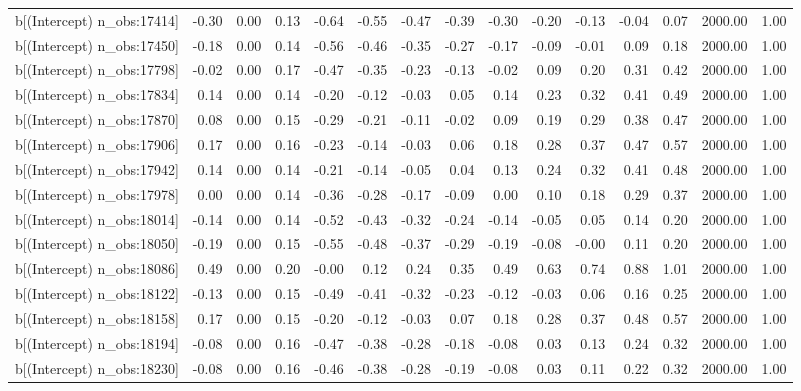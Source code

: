 \begin{table}[ht]
\begin{tabular}{rrrrrrrrrrrrrrr}
  b[(Intercept) n\_obs:17414] & -0.30 & 0.00 & 0.13 & -0.64 & -0.55 & -0.47 & -0.39 & -0.30 & -0.20 & -0.13 & -0.04 & 0.07 & 2000.00 & 1.00 \\ 
  b[(Intercept) n\_obs:17450] & -0.18 & 0.00 & 0.14 & -0.56 & -0.46 & -0.35 & -0.27 & -0.17 & -0.09 & -0.01 & 0.09 & 0.18 & 2000.00 & 1.00 \\ 
  b[(Intercept) n\_obs:17798] & -0.02 & 0.00 & 0.17 & -0.47 & -0.35 & -0.23 & -0.13 & -0.02 & 0.09 & 0.20 & 0.31 & 0.42 & 2000.00 & 1.00 \\ 
  b[(Intercept) n\_obs:17834] & 0.14 & 0.00 & 0.14 & -0.20 & -0.12 & -0.03 & 0.05 & 0.14 & 0.23 & 0.32 & 0.41 & 0.49 & 2000.00 & 1.00 \\ 
  b[(Intercept) n\_obs:17870] & 0.08 & 0.00 & 0.15 & -0.29 & -0.21 & -0.11 & -0.02 & 0.09 & 0.19 & 0.29 & 0.38 & 0.47 & 2000.00 & 1.00 \\ 
  b[(Intercept) n\_obs:17906] & 0.17 & 0.00 & 0.16 & -0.23 & -0.14 & -0.03 & 0.06 & 0.18 & 0.28 & 0.37 & 0.47 & 0.57 & 2000.00 & 1.00 \\ 
  b[(Intercept) n\_obs:17942] & 0.14 & 0.00 & 0.14 & -0.21 & -0.14 & -0.05 & 0.04 & 0.13 & 0.24 & 0.32 & 0.41 & 0.48 & 2000.00 & 1.00 \\ 
  b[(Intercept) n\_obs:17978] & 0.00 & 0.00 & 0.14 & -0.36 & -0.28 & -0.17 & -0.09 & 0.00 & 0.10 & 0.18 & 0.29 & 0.37 & 2000.00 & 1.00 \\ 
  b[(Intercept) n\_obs:18014] & -0.14 & 0.00 & 0.14 & -0.52 & -0.43 & -0.32 & -0.24 & -0.14 & -0.05 & 0.05 & 0.14 & 0.20 & 2000.00 & 1.00 \\ 
  b[(Intercept) n\_obs:18050] & -0.19 & 0.00 & 0.15 & -0.55 & -0.48 & -0.37 & -0.29 & -0.19 & -0.08 & -0.00 & 0.11 & 0.20 & 2000.00 & 1.00 \\ 
  b[(Intercept) n\_obs:18086] & 0.49 & 0.00 & 0.20 & -0.00 & 0.12 & 0.24 & 0.35 & 0.49 & 0.63 & 0.74 & 0.88 & 1.01 & 2000.00 & 1.00 \\ 
  b[(Intercept) n\_obs:18122] & -0.13 & 0.00 & 0.15 & -0.49 & -0.41 & -0.32 & -0.23 & -0.12 & -0.03 & 0.06 & 0.16 & 0.25 & 2000.00 & 1.00 \\ 
  b[(Intercept) n\_obs:18158] & 0.17 & 0.00 & 0.15 & -0.20 & -0.12 & -0.03 & 0.07 & 0.18 & 0.28 & 0.37 & 0.48 & 0.57 & 2000.00 & 1.00 \\ 
  b[(Intercept) n\_obs:18194] & -0.08 & 0.00 & 0.16 & -0.47 & -0.38 & -0.28 & -0.18 & -0.08 & 0.03 & 0.13 & 0.24 & 0.32 & 2000.00 & 1.00 \\ 
  b[(Intercept) n\_obs:18230] & -0.08 & 0.00 & 0.16 & -0.46 & -0.38 & -0.28 & -0.19 & -0.08 & 0.03 & 0.11 & 0.22 & 0.32 & 2000.00 & 1.00 \\ 

\end{tabular}
\end{table}
